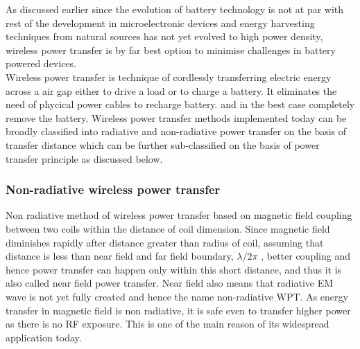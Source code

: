 \documentclass[12pt,a4paper,UKenglish]{article}
\begin{document}
As discussed earlier since the evolution of battery technology is not at par with rest of the development in 
microelectronic devices and energy harvesting techniques from natural sources has not yet evolved to high power
density, wireless power transfer is by far best option to minimise challenges in battery powered devices. \\

Wireless power transfer is technique of cordlessly transferring electric energy across a air gap either to drive 
a load or to charge a battery. It eliminates the need of phycical power cables to recharge battery. and in the 
best case completely remove the battery. Wireless power transfer methods implemented today can be broadly 
classified into radiative and non-radiative power transfer on the basis of transfer distance which can be further 
sub-classified on the basis of power transfer principle \cite{wpt_fund_std} as discussed below.\\


\subsubsection{Non-radiative wireless power transfer}

Non radiative method of wireless power transfer based on magnetic field coupling between two coils within the distance of coil dimension. Since magnetic field diminishes rapidly after distance greater than radius of coil, assuming that distance is less than near field and far field boundary, $\lambda /2\pi$  \cite[pp. 63]{rfid_2010}, better coupling and hence power transfer can happen only within this short distance, and thus it is also called near field power transfer. Near field also means that radiative EM wave is not yet fully created and hence the name non-radiative WPT. As energy transfer in magnetic field is non radiative, it is safe even to transfer higher power as there is no RF exposure. This is one of the main reason of its widespread application today. \\
\end{document}
